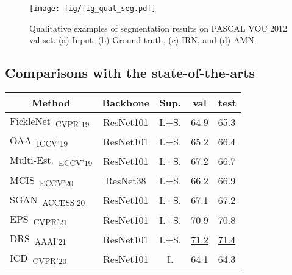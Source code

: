 \documentclass[10pt,twocolumn,letterpaper]{article}
\begin{document}
\begin{figure*}[t!]
\centering
\texttt{[image: fig/fig\_qual\_seg.pdf]}
\vspace{-2mm}
\caption{Qualitative examples of segmentation results on PASCAL VOC 2012 val set. (a) Input, (b) Ground-truth, (c) IRN, and (d) AMN.}
\label{fig:seg_qual_voc}
\vspace{-5mm}
\end{figure*} 
\subsection{Comparisons with the state-of-the-arts}

\begin{table}[]
\centering
{\small
\begin{tabular}{@{}lccll@{}}
\toprule
\multicolumn{1}{c}{Method}                                                              & Backbone    & Sup.  & \multicolumn{1}{c}{val} & \multicolumn{1}{c}{test} \\ \midrule
\multicolumn{1}{l}{FickleNet~\cite{lee2019ficklenet}\textsubscript{CVPR'19}}            & ResNet101  & I.+S. & 64.9                    & 65.3                     \\
\multicolumn{1}{l}{OAA~\cite{jiang2019integral}\textsubscript{ICCV'19}}                 & ResNet101  & I.+S. & 65.2                    & 66.4                     \\
\multicolumn{1}{l}{Multi-Est.~\cite{fan2020employing}\textsubscript{ECCV'19}}           & ResNet101  & I.+S. & 67.2                    & 66.7                     \\
\multicolumn{1}{l}{MCIS~\cite{sun2020mining}\textsubscript{ECCV'20}}                    & ResNet38  & I.+S. & 66.2                    & 66.9                     \\
\multicolumn{1}{l}{SGAN~\cite{yao2020saliency}\textsubscript{ACCESS'20}}                & ResNet101  & I.+S. & 67.1                    & 67.2                     \\
\multicolumn{1}{l}{EPS~\cite{Lee_2021_CVPR}\textsubscript{CVPR'21}}                        & ResNet101  & I.+S.    & 70.9                    & 70.8                     \\ 
\multicolumn{1}{l}{DRS~\cite{KimHK21DRS}\textsubscript{AAAI'21}}                        & ResNet101  & I.+S.    & \underline{71.2}                    & \underline{71.4}                     \\ \midrule
\multicolumn{1}{l}{ICD~\cite{fan2020learning}\textsubscript{CVPR'20}}                   & ResNet101  & I.    & 64.1                    & 64.3                     \\ 

\end{tabular}}
\end{table}
\end{document}
